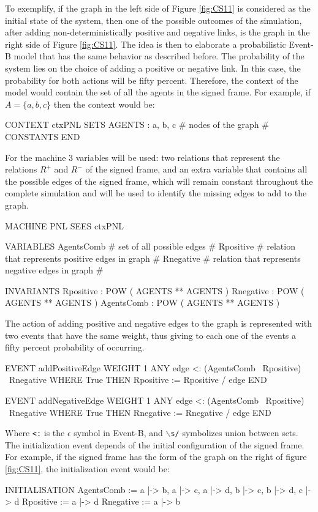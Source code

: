 To exemplify, if the graph in the left side of Figure \ref{fig:CS11} is considered as the initial state of the system, then one of the possible outcomes of the simulation, after adding non-deterministically positive and negative links, is the graph in the right side of Figure \ref{fig:CS11}. The idea is then to elaborate a probabilistic Event-B model that has the same behavior as described before. The probability of the system lies on the choice of adding a positive or negative link. In this case, the probability for both actions will be fifty percent. Therefore, the context of the model would contain the set of all the agents in the signed frame. For example, if $A = \{a,b,c\}$ then the context would be:
\begin{maude2}

CONTEXT ctxPNL
SETS 
    AGENTS : { a, b, c } # nodes of the graph #
CONSTANTS 
END
\end{maude2}

For the machine 3 variables will be used: two relations that represent the relations $R^+$ and $R^-$ of the signed frame, and an extra variable that contains all the possible edges of the signed frame, which will remain constant throughout the complete simulation and will be used to identify the missing edges to add to the graph.

\begin{maude2}

MACHINE PNL
  SEES ctxPNL

  VARIABLES
    AgentsComb # set of all possible edges #
    Rpositive # relation that represents positive edges in graph #
    Rnegative # relation that represents negative edges in graph # 

  INVARIANTS
    Rpositive :  POW ( AGENTS ** AGENTS )
    Rnegative :  POW ( AGENTS ** AGENTS )
    AgentsComb :  POW ( AGENTS ** AGENTS )
\end{maude2}
The action of adding positive and negative edges to the graph is represented with two events that have the same weight, thus giving to each one of the events a fifty percent probability of occurring. 
\begin{maude2}

  EVENT addPositiveEdge 
  WEIGHT 1
  ANY 
    edge <: (AgentsComb \ Rpositive) \ Rnegative
  WHERE
    True 
  THEN
    Rpositive := Rpositive \s/ edge
  END

  EVENT addNegativeEdge 
  WEIGHT 1
  ANY 
    edge <: (AgentsComb \ Rpositive) \ Rnegative
  WHERE
    True 
  THEN
    Rnegative := Rnegative \s/ edge
  END
\end{maude2}
Where \texttt{<:} is the $\epsilon$ symbol in Event-B, and \texttt{$\backslash$s/} symbolizes union between sets. The initialization event depends of the initial configuration of the signed frame. For example, if the signed frame has the form of the graph on the right of figure \ref{fig:CS11}, the initialization event would be:
\begin{maude2}
    
INITIALISATION
    AgentsComb := { a |-> b, a |-> c, a |-> d, 
                    b |-> c, b |-> d,
                    c |-> d }
    Rpositive := {a |-> d} 
    Rnegative := {a |-> b}
\end{maude2}


